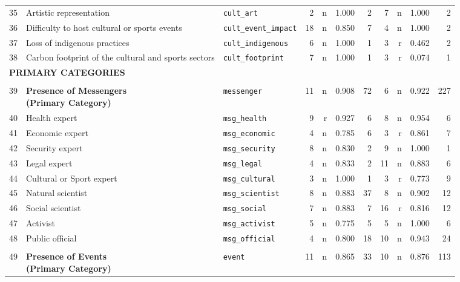 \begin{longtable}{p{0.5cm}p{4.0cm}p{3.0cm}rrrrrrrr}
\cmidrule(lr){1-11}
35 & Artistic representation & \texttt{cult\_art} & 2 & n & 1.000 & 2 & 7 & n & 1.000 & 2 \\
36 & Difficulty to host cultural or sports events & \texttt{cult\_event\_impact} & 18 & n & 0.850 & 7 & 4 & n & 1.000 & 2 \\
37 & Loss of indigenous practices & \texttt{cult\_indigenous} & 6 & n & 1.000 & 1 & 3 & r & 0.462 & 2 \\
38 & Carbon footprint of the cultural and sports sectors & \texttt{cult\_footprint} & 7 & n & 1.000 & 1 & 3 & r & 0.074 & 1 \\
\midrule
\multicolumn{11}{l}{\cellcolor{gray!10}\textbf{PRIMARY CATEGORIES}} \\
\midrule
\rowcolor{gray!8}
\multicolumn{11}{l}{\textit{Actors/Messengers}} \\
\midrule
39 & \textbf{Presence of Messengers\newline (Primary Category)} & \texttt{messenger} & 11 & n & 0.908 & 72 & 6 & n & 0.922 & 227 \\
\cmidrule(lr){1-11}
40 & Health expert & \texttt{msg\_health} & 9 & r & 0.927 & 6 & 8 & n & 0.954 & 6 \\
41 & Economic expert & \texttt{msg\_economic} & 4 & n & 0.785 & 6 & 3 & r & 0.861 & 7 \\
42 & Security expert & \texttt{msg\_security} & 8 & n & 0.830 & 2 & 9 & n & 1.000 & 1 \\
43 & Legal expert & \texttt{msg\_legal} & 4 & n & 0.833 & 2 & 11 & n & 0.883 & 6 \\
44 & Cultural or Sport expert & \texttt{msg\_cultural} & 3 & n & 1.000 & 1 & 3 & r & 0.773 & 9 \\
45 & Natural scientist & \texttt{msg\_scientist} & 8 & n & 0.883 & 37 & 8 & n & 0.902 & 12 \\
46 & Social scientist & \texttt{msg\_social} & 7 & n & 0.883 & 7 & 16 & r & 0.816 & 12 \\
47 & Activist & \texttt{msg\_activist} & 5 & n & 0.775 & 5 & 5 & n & 1.000 & 6 \\
48 & Public official & \texttt{msg\_official} & 4 & n & 0.800 & 18 & 10 & n & 0.943 & 24 \\
\midrule
\rowcolor{gray!8}
\multicolumn{11}{l}{\textit{Events}} \\
\midrule
49 & \textbf{Presence of Events\newline (Primary Category)} & \texttt{event} & 11 & n & 0.865 & 33 & 10 & n & 0.876 & 113 \\
\cmidrule(lr){1-11}

\end{longtable}
